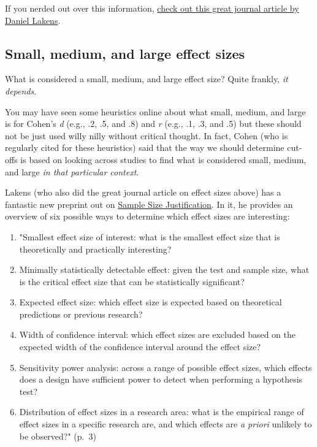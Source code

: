 \documentclass[
]{book}
\providecommand{\tightlist}{%
  \setlength{\itemsep}{0pt}\setlength{\parskip}{0pt}}
\begin{document}
If you nerded out over this information, \href{https://www.frontiersin.org/articles/10.3389/fpsyg.2013.00863/full}{check out this great journal article by Daniel Lakens}.

\hypertarget{small-medium-and-large-effect-sizes}{%
\subsection{Small, medium, and large effect sizes}\label{small-medium-and-large-effect-sizes}}

What is considered a small, medium, and large effect size? Quite frankly, \emph{it depends}.

You may have seen some heuristics online about what small, medium, and large is for Cohen's \emph{d} (e.g., .2, .5, and .8) and \emph{r} (e.g., .1, .3, and .5) but these should not be just used willy nilly without critical thought. In fact, Cohen (who is regularly cited for these heuristics) said that the way we should determine cut-offs is based on looking across studies to find what is considered small, medium, and large \emph{in that particular context}.

Lakens (who also did the great journal article on effect sizes above) has a fantastic new preprint out on \href{https://psyarxiv.com/9d3yf/}{Sample Size Justification}. In it, he provides an overview of six possible ways to determine which effect sizes are interesting:

\begin{enumerate}
\def\labelenumi{\arabic{enumi}.}
\tightlist
\item
  "Smallest effect size of interest: what is the smallest effect size that is theoretically and practically interesting?
\item
  Minimally statistically detectable effect: given the test and sample size, what is the critical effect size that can be statistically significant?
\item
  Expected effect size: which effect size is expected based on theoretical predictions or previous research?
\item
  Width of confidence interval: which effect sizes are excluded based on the expected width of the confidence interval around the effect size?
\item
  Sensitivity power analysis: across a range of possible effect sizes, which effects does a design have sufficient power to detect when performing a hypothesis test?
\item
  Distribution of effect sizes in a research area: what is the empirical range of effect sizes in a specific research are, and which effects are \emph{a priori} unlikely to be observed?" (p.~3)
\end{enumerate}
\end{document}
